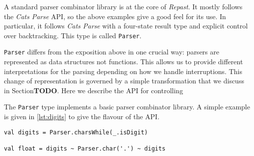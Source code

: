 A standard parser combinator library is at the core of \emph{Repast}. It mostly follows the \emph{Cats Parse} API, so the above examples give a good feel for its use. In particular, it follows \emph{Cats Parse} with a four-state result type and explicit control over backtracking. This type is called \lstinline{Parser}.

\lstinline{Parser} differs from the exposition above in one crucial way: parsers are represented as data structures not functions. This allows us to provide different interpretations for the parsing depending on how we handle interruptions. This change of representation is governed by a simple transformation that we discuss in Section\~\textbf{TODO}. Here we describe the API for controlling

The \lstinline{Parser} type implements a basic parser combinator library. A simple example is given in \ref{lst:digits} to give the flavour of the API.

\begin{lstlisting}[frame=lines,float,caption={A simple parser to recognise a subset of floating point numbers}]
val digits = Parser.charsWhile(_.isDigit)

val float = digits ~ Parser.char('.') ~ digits
\end{lstlisting}
